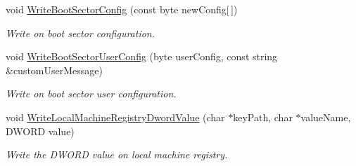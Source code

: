\begin{DoxyCompactItemize}
void \hyperlink{class_gost_crypt_1_1_boot_encryption_ac161b91655c0ee99d72b5b7f68ca04a3}{Write\+Boot\+Sector\+Config} (const byte new\+Config\mbox{[}$\,$\mbox{]})
\begin{DoxyCompactList}\small\item\em Write on boot sector configuration. \end{DoxyCompactList}\item 
void \hyperlink{class_gost_crypt_1_1_boot_encryption_ac87f57dd76b5e427925623539dd34d7c}{Write\+Boot\+Sector\+User\+Config} (byte user\+Config, const string \&custom\+User\+Message)
\begin{DoxyCompactList}\small\item\em Write on boot sector user configuration. \end{DoxyCompactList}\item 
void \hyperlink{class_gost_crypt_1_1_boot_encryption_a3c129c6a89e38d3fd55b0a0df37bdead}{Write\+Local\+Machine\+Registry\+Dword\+Value} (char $\ast$key\+Path, char $\ast$value\+Name, D\+W\+O\+RD value)
\begin{DoxyCompactList}\small\item\em Write the D\+W\+O\+RD value on local machine registry. \end{DoxyCompactList}\end{DoxyCompactItemize}
